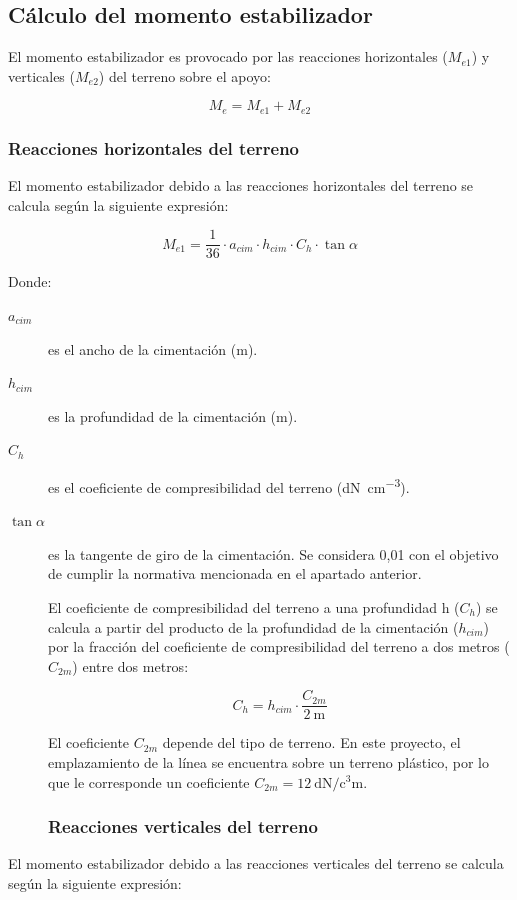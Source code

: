 \subsection{Cálculo del momento estabilizador}
\label{subsubsec:cimentaciones-momento-estabilizador}
El momento estabilizador es provocado por las reacciones horizontales ($M_{e1}$) y verticales ($M_{e2}$) del terreno sobre el apoyo:

\begin{equation}
    M_e = M_{e1}+M_{e2}
    \label{eq:momento-estabilizador}
\end{equation}

\subsubsection{Reacciones horizontales del terreno}
\label{subsubsec:momento-estabilizador1}
El momento estabilizador debido a las reacciones horizontales del terreno se calcula según la siguiente expresión:

\begin{equation}
    M_{e1} = \frac{1}{36}\cdot a_{cim}\cdot h_{cim}\cdot C_h\cdot\tan\alpha
    \label{eq:momento-estabilizador1}
\end{equation}

Donde:
\begin{description}
    \item[$a_{cim}$] es el ancho de la cimentación (\si{\meter}).
    \item[$h_{cim}$] es la profundidad de la cimentación (\si{\meter}).
    \item[$C_h$] es el coeficiente de compresibilidad del terreno (\si{\deca\newton\per\cubic\centi\meter}).
    \item[$\tan\alpha$] es la tangente de giro de la cimentación. Se considera 0,01 con el objetivo de cumplir la normativa mencionada en el apartado anterior.

El coeficiente de compresibilidad del terreno a una profundidad h ($C_h$) se calcula a partir del producto de la profundidad de la cimentación ($h_{cim}$) por la fracción del coeficiente de compresibilidad del terreno a dos metros ($C_{2m}$) entre dos metros:

\begin{equation}
    C_h=h_{cim}\cdot\frac{C_{2m}}{\SI{2}{\meter}}
    \label{eq:coeficiente-compresibilidad}
\end{equation}

El coeficiente $C_{2m}$ depende del tipo de terreno. En este proyecto, el emplazamiento de la línea se encuentra sobre un terreno plástico, por lo que le corresponde un coeficiente $C_{2m}=\SI{12}{\deca\newton\per\cubic\centi\meter}$.
\subsubsection{Reacciones verticales del terreno}
\end{description}
\label{subsubsec:momento-estabilizador2}
El momento estabilizador debido a las reacciones verticales del terreno se calcula según la siguiente expresión:

